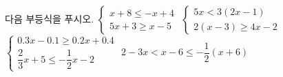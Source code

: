 다음 부등식을 푸시오.
 $\begin{cases} x+8\le -x+4 \\ 5x+3\ge x-5 \end{cases}$
 $\begin{cases} 5x<3(2x-1) \\ 2(x-3)\ge 4x-2 \end{cases}$
 $\begin{cases} 0.3x-0.1\ge 0.2x+0.4 \\ \dfrac{2}{3}x+5\le -\dfrac{1}{2}x-2 \end{cases}$
 $2-3x<x-6\le -\dfrac{1}{2}(x+6)$
